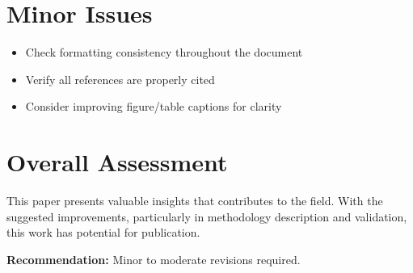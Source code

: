 \documentclass[11pt]{article}
\begin{document}
\section{Minor Issues}
\begin{itemize}
\item Check formatting consistency throughout the document
\item Verify all references are properly cited
\item Consider improving figure/table captions for clarity
\end{itemize}

\section{Overall Assessment}
This paper presents valuable insights that contributes to the field. With the suggested improvements, particularly in methodology description and validation, this work has potential for publication.

\textbf{Recommendation:} Minor to moderate revisions required.
\end{document}
